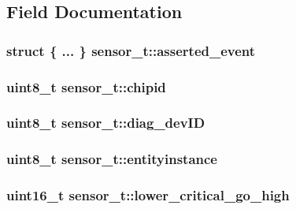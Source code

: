 \subsection{Field Documentation}
\hypertarget{structsensor__t_a1c2f2c399c7df940cdd4bdc52c8620a6}{
\subsubsection[{asserted\-\_\-event}]{\setlength{\rightskip}{0pt plus 5cm}struct \{ ... \}   sensor\-\_\-t\-::asserted\-\_\-event}}\label{structsensor__t_a1c2f2c399c7df940cdd4bdc52c8620a6}
\hypertarget{structsensor__t_a6f4da18e0f441fb708e3df7506263b65}{
\subsubsection[{chipid}]{\setlength{\rightskip}{0pt plus 5cm}uint8\-\_\-t sensor\-\_\-t\-::chipid}}\label{structsensor__t_a6f4da18e0f441fb708e3df7506263b65}
\hypertarget{structsensor__t_a3bde4fa4b5359922eaf87ba51a0b4b84}{
\subsubsection[{diag\-\_\-dev\-I\-D}]{\setlength{\rightskip}{0pt plus 5cm}uint8\-\_\-t sensor\-\_\-t\-::diag\-\_\-dev\-I\-D}}\label{structsensor__t_a3bde4fa4b5359922eaf87ba51a0b4b84}
\hypertarget{structsensor__t_a9916aa73072580999a282bb1b7ec5bc6}{
\subsubsection[{entityinstance}]{\setlength{\rightskip}{0pt plus 5cm}uint8\-\_\-t sensor\-\_\-t\-::entityinstance}}\label{structsensor__t_a9916aa73072580999a282bb1b7ec5bc6}
\hypertarget{structsensor__t_a943379247f53b621035e9d93a1bca8d8}{
\subsubsection[{lower\-\_\-critical\-\_\-go\-\_\-high}]{\setlength{\rightskip}{0pt plus 5cm}uint16\-\_\-t sensor\-\_\-t\-::lower\-\_\-critical\-\_\-go\-\_\-high}}\label{structsensor__t_a943379247f53b621035e9d93a1bca8d8}
